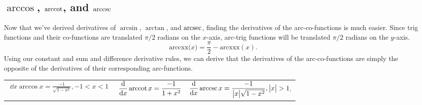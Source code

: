 \subsection{$\arccos$, $\operatorname{arccot}$, and $\operatorname{arccsc}$}
Now that we've derived derivatives of $\arcsin$, $\arctan$, and $\operatorname{arcsec}$, finding the derivatives of the arc-co-functions is much easier.
Since trig functions and their co-functions are translated $\pi/2$ radians on the $x$-axis, arc-trig functions will be translated $\pi/2$ radians on the $y$-axis.
\begin{equation*}
	\text{arccxx{($x$)}} = \frac{\pi}{2} - \text{arcxxx}{(x)}.
\end{equation*}
Using our constant and sum and difference derivative rules, we can derive that the derivatives of the arc-co-functions are simply the opposite of the derivatives of their corresponding arc-functions.
\begin{table}[H]
	\begin{center}
		\begin{tabular}{ l l l }
			$\begin{aligned}\dd{}{x}\arccos{x}=\frac{-1}{\sqrt{1-x^2}},-1<x<1\end{aligned}$ & $\begin{aligned}\frac{\mathrm{d} }{\mathrm{d} x}\operatorname{arccot}{x}=\frac{-1}{1+x^2}\end{aligned}$ & $\begin{aligned}\frac{\mathrm{d} }{\mathrm{d} x}\operatorname{arccsc}{x}=\frac{-1}{\big\lvert x \big\rvert\sqrt{1-x^2}},\big\lvert x \big\rvert>1\end{aligned}.$ \\
		\end{tabular}
	\end{center}
\end{table}